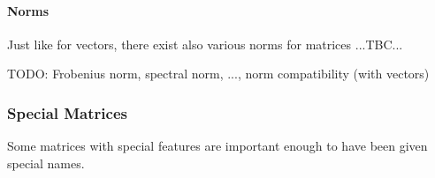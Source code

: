 




\paragraph{Norms}
Just like for vectors, there exist also various norms for matrices ...TBC...

TODO: Frobenius norm, spectral norm, ..., norm compatibility (with vectors)




\subsubsection{Special Matrices} %
Some matrices with special features are important enough to have been given special names.



